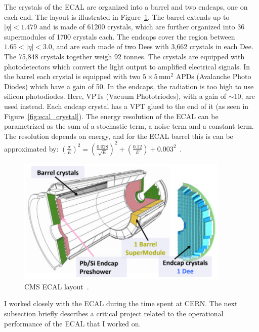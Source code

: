 The crystals of the ECAL are organized into a barrel and two endcaps, one on each end. The layout is illustrated in Figure~\ref{fig:ecal_layout}. The barrel extends up to $|\eta|<1.479$ and is made of 61200 crystals, which are further organized into 36 supermodules of 1700 crystals each. The endcaps cover the region between  $1.65<|\eta|<3.0$, and are each made of two Dees with 3,662 crystals in each Dee. The 75,848 crystals together weigh 92 tonnes. The crystals are equipped with photodetectors which convert the light output to amplified electrical signals. In the barrel each crystal is equipped with two $5\times5\,\mathrm{mm}^2$ APDs (Avalanche Photo Diodes) which have a gain of 50. In the endcaps, the radiation is too high to use silicon photodiodes. Here, VPTs (Vacuum Phototriodes), with a gain of $\sim$10, are used instead. Each endcap crystal has a VPT glued to the end of it (as seen in Figure~\ref{fig:ecal_crystal}). The energy resolution of the ECAL can be parametrized as the sum of a stochastic term, a noise term and a constant term. The resolution depends on energy, and for the ECAL barrel this is can be approximated by: $(\frac{\sigma}{E})^2=(\frac{0.028}{\sqrt{E}})^2+(\frac{0.12}{E})+0.003^2$~\cite{ecal3}.

\begin{figure}
  \begin{center}
  \captionsetup{justification=centering}
  \includegraphics[width=0.9\textwidth,keepaspectratio]{plots_and_figures/chapter3/ecal_layout.png}
\caption{CMS ECAL layout~\cite{ecal2}.}
\label{fig:ecal_layout}
\end{center}
\end{figure}

I worked closely with the ECAL during the time spent at CERN. The next subsection briefly describes a critical project related to the operational performance of the ECAL that I worked on.

